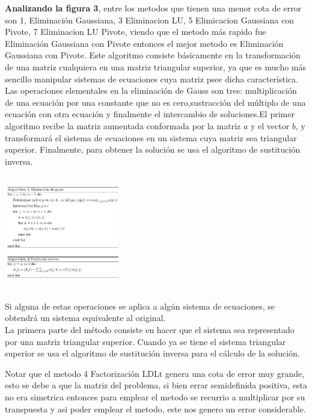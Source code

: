 \documentclass[10pt,a4paper]{article}
\begin{document}
\begin{multicols}{2}
\noindent \textbf{Analizando la figura 3}, entre los metodos que tienen una menor cota de error son 1, Eliminación Gaussiana, 3 Eliminacion LU, 5 Elimicacion Gaussiana con Pivote, 7 Eliminacion LU Pivote, viendo que el metodo más rapido fue Eliminación Gaussiana con Pivote entonces el mejor metodo es Eliminación Gaussiana con Pivote. Este algoritmo consiste básicamente en la transformación de una matriz cualquiera en una matriz triangular superior, ya que es mucho más sencillo manipular sistemas de ecuaciones cuya matriz psee dicha característica. Las operaciones elementales en la eliminación de Gauss son tres: multiplicación de una ecuación por una constante que no es cero,sustracción del múltiplo de una ecuación con otra ecuación y finalmente el intercambio de soluciones.El primer algoritmo recibe la matriz aumentada conformada por la matriz $a$ y el vector $b$, y transformará el sistema de ecuaciones en un sistema cuya matriz sea triangular superior. Finalmente, para obtener la solución se usa el algoritmo de sustitución inversa.\\ 

\begin{center}
	\centering
	\includegraphics[width=5cm,height=5cm]{algoritmos.jpg}
	\\

\end{center}


\noindent Si alguna de estas operaciones se aplica a algún sistema de ecuaciones, se obtendrá un sistema equivalente al original.\\
La primera parte del método consiste en hacer que el sistema sea representado por una matriz triangular superior. Cuando ya se tiene el sistema triangular superior se usa el algoritmo de sustitución inversa para el cálculo de la solución.

\noindent Notar que el metodo 4 Factorización LDLt genera una cota de error muy grande, esto se debe a que la matriz del problema, si bien errar semidefinida positiva, esta no era simetrica entonces para emplear el metodo se recurrio a multiplicar por su transpuesta y asi poder emplear el metodo, este nos genero un error considerable.\\
\end{multicols}
\end{document}
